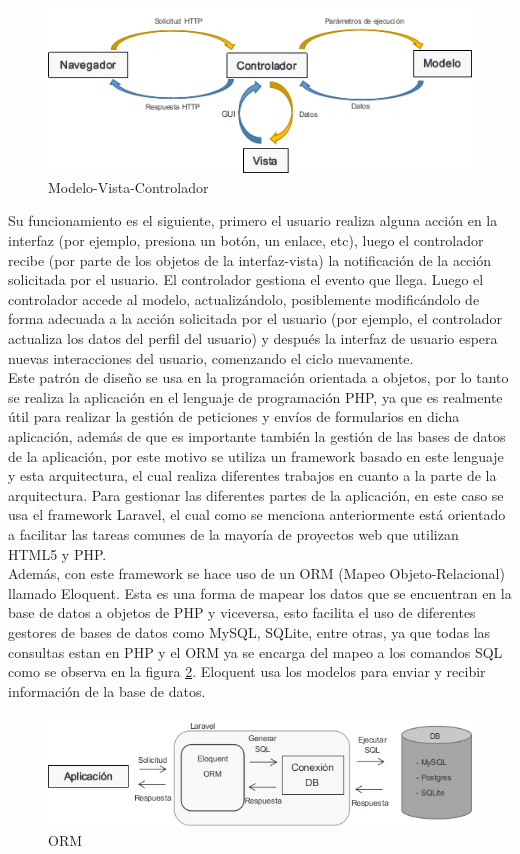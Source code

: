 
\begin{figure}[H]
	\centering
	\caption{Modelo-Vista-Controlador}
	\label{fig:mvc}
	\includegraphics[width=0.7\linewidth]{Imagenes/MVC}
\end{figure}


Su funcionamiento es el siguiente, primero el usuario realiza alguna acción en la interfaz (por ejemplo, presiona un botón, un enlace, etc), luego el controlador recibe (por parte de los objetos de la interfaz-vista) la notificación de la acción solicitada por el usuario. El controlador gestiona el evento que llega. Luego el controlador accede al modelo, actualizándolo, posiblemente modificándolo de forma adecuada a la acción solicitada por el usuario (por ejemplo, el controlador actualiza los datos del perfil del usuario) y después la interfaz de usuario espera nuevas interacciones del usuario, comenzando el ciclo nuevamente.\\

Este patrón de diseño se usa en la programación orientada a objetos, por lo tanto se realiza la aplicación en el lenguaje de programación PHP, ya que es realmente útil para realizar la gestión de peticiones y envíos de formularios en dicha aplicación, además de que es importante también la gestión de las bases de datos de la aplicación, por este motivo se utiliza un framework basado en este lenguaje y esta arquitectura, el cual realiza diferentes trabajos en cuanto a la parte de la arquitectura. Para gestionar las diferentes partes de la aplicación, en este caso se usa el framework Laravel, el cual como se menciona anteriormente está orientado a facilitar las tareas comunes de la mayoría de proyectos web que utilizan HTML5 y PHP.\\

Además, con este framework se hace uso de un ORM (Mapeo Objeto-Relacional) llamado Eloquent. Esta es una forma de mapear los datos que se encuentran en la base de datos a objetos de PHP y viceversa, esto facilita el uso de diferentes gestores de bases de datos como MySQL, SQLite, entre otras, ya que todas las consultas estan en PHP y el ORM ya se encarga del mapeo a los comandos SQL como se observa en la figura \ref{fig:orm}. Eloquent usa los modelos para enviar y recibir información de la base de datos.

\begin{figure}[H]
	\centering
	\caption{ORM}
	\label{fig:orm}
	\includegraphics[width=0.7\linewidth]{Imagenes/ORM}
\end{figure}


